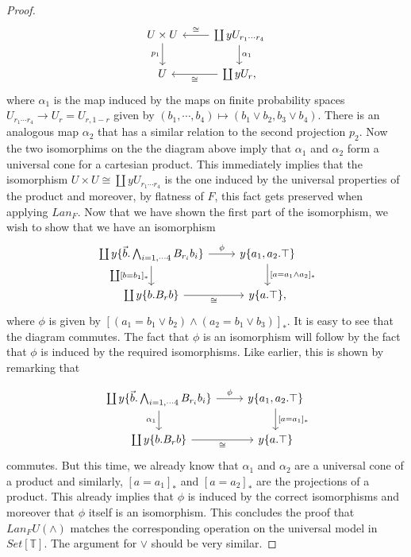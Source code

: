 \documentclass[a4paper]{amsproc}
\theoremstyle{plain}
\theoremstyle{definition}
\theoremstyle{remark}
\numberwithin{equation}{section}
\begin{document}
\begin{proof}
\[
\begin{tikzcd}
U \times U \arrow[d, "p_1"'] & \coprod y U_{r_1 \cdots r_4} \arrow[d, "\alpha_1"] \arrow[l, "\cong"'] \\
U                            & \coprod y U_r \arrow[l, "\cong"]                                    ,
\end{tikzcd}
\]
where $\alpha_1$ is the map induced by the maps on finite probability spaces $U_{r_1 \cdots r_4} \to U_r = U_{r,1-r}$ given by $(b_1,\cdots,b_4) \mapsto (b_1 \vee b_2, b_3 \vee b_4)$. There is an analogous map $\alpha_2$ that has a similar relation to the second projection $p_2$. Now the two isomorphims on the the diagram above imply that $\alpha_1$ and $\alpha_2$ form a universal cone for a cartesian product. This immediately implies that the isomorphism $U \times U \cong \coprod y U_{r_1 \cdots r_4}$ is the one induced by the universal properties of the product and moreover, by flatness of $F$, this fact gets preserved when applying $Lan_F$. Now that we have shown the first part of the isomorphism, we wish to show that we have an isomorphism
\[
\begin{tikzcd}
{\coprod y \{\vec{b}.\bigwedge_{i=1,\cdots 4} B_{r_i} b_i\}} \arrow[d, "{\coprod [b = b_1]_*}"'] \arrow[r, "\phi"] & {y \{a_1,a_2.\top\}} \arrow[d, "{[a = a_1 \wedge a_2]_*}"] \\
\coprod y \{b.B_rb\} \arrow[r, "\cong"']                                                & y\{a.\top\}                                               ,
\end{tikzcd}
\]
where $\phi$ is given by $[(a_1 = b_1 \vee b_2) \wedge (a_2 = b_1 \vee b_3)]_*$. It is easy to see that the diagram commutes. The fact that $\phi$ is an isomorphism will follow by the fact that $\phi$ is induced by the required isomorphisms. Like earlier, this is shown by remarking that

\[
\begin{tikzcd}
{\coprod y \{\vec{b}.\bigwedge_{i=1,\cdots 4} B_{r_i} b_i\}} \arrow[d, "\alpha_1"'] \arrow[r, "\phi"] & {y \{a_1,a_2.\top\}} \arrow[d, "{[a = a_1]_*}"] \\
\coprod y \{b.B_rb\} \arrow[r, "\cong"']                                                            & y\{a.\top\}
\end{tikzcd}
\]
commutes. But this time, we already know that $\alpha_1$ and $\alpha_2$ are a universal cone of a product and similarly, $[a=a_1]_*$ and $[a=a_2]_*$ are the projections of a product. This already implies that $\phi$ is induced by the correct isomorphisms and moreover that $\phi$ itself is an isomorphism. This concludes the proof that $Lan_F U(\wedge)$ matches the corresponding operation on the universal model in $Set[\mathbb{T}]$. The argument for $\vee$ should be very similar.


\end{proof}
\end{document}
